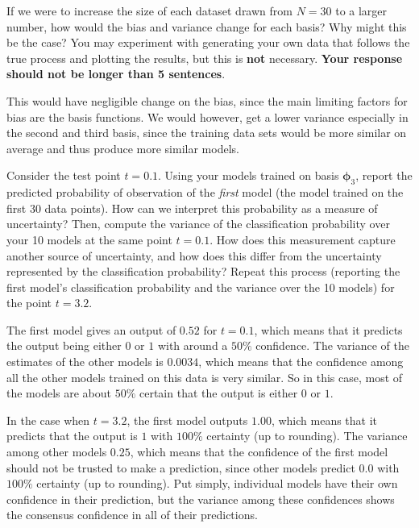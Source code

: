 \documentclass[expanded]{lkx_pset}
\begin{document}
\begin{parts}
	\begin{part}{3}
		If we were to increase the size of each dataset drawn from $N = 30$ to a larger number, how would the bias and variance change for each basis? Why might this be the case? You may experiment with generating your own data that follows the true process and plotting the results, but this is \textbf{not} necessary. \textbf{Your response should not be longer than 5 sentences}.
	\end{part}

	This would have negligible change on the bias, since the main limiting factors for bias are the basis functions. We would however, get a lower variance especially in the second and third basis, since the training data sets would be more similar on average and thus produce more similar models.

	\begin{part}{4}
		Consider the test point $t = 0.1$. Using your models trained on basis $\bm\phi_3$, report the predicted probability of observation of the \textit{first} model (the model trained on the first 30 data points). How can we interpret this probability as a measure of uncertainty? Then, compute the variance of the classification probability over your 10 models at the same point $t = 0.1$. How does this measurement capture another source of uncertainty, and how does this differ from the uncertainty represented by the classification probability? Repeat this process (reporting the first model's classification probability and the variance over the 10 models) for the point $t = 3.2$.
	\end{part}

	The first model gives an output of $0.52$ for $t=0.1$, which means that it predicts the output being either $0$ or $1$ with around a $50\%$ confidence. The variance of the estimates of the other models is $0.0034$, which means that the confidence among all the other models trained on this data is very similar. So in this case, most of the models are about $50\%$ certain that the output is either $0$ or $1$.

	In the case when $t=3.2$, the first model outputs $1.00$, which means that it predicts that the output is $1$ with $100\%$ certainty (up to rounding). The variance among other models $0.25$, which means that the confidence of the first model should not be trusted to make a prediction, since other models predict $0.0$ with $100\%$ certainty (up to rounding).
	Put simply, individual models have their own confidence in their prediction, but the variance among these confidences shows the consensus confidence in all of their predictions.


\end{parts}
\end{document}

